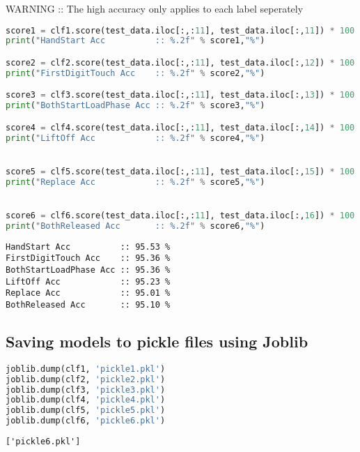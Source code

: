 WARNING :: The high accuracy only applies to each label seperately

\begin{lstlisting}[language=Python]
score1 = clf1.score(test_data.iloc[:,:11], test_data.iloc[:,11]) * 100
print("HandStart Acc          :: %.2f" % score1,"%")

score2 = clf2.score(test_data.iloc[:,:11], test_data.iloc[:,12]) * 100
print("FirstDigitTouch Acc    :: %.2f" % score2,"%")

score3 = clf3.score(test_data.iloc[:,:11], test_data.iloc[:,13]) * 100
print("BothStartLoadPhase Acc :: %.2f" % score3,"%")

score4 = clf4.score(test_data.iloc[:,:11], test_data.iloc[:,14]) * 100
print("LiftOff Acc            :: %.2f" % score4,"%")


score5 = clf5.score(test_data.iloc[:,:11], test_data.iloc[:,15]) * 100
print("Replace Acc            :: %.2f" % score5,"%")


score6 = clf6.score(test_data.iloc[:,:11], test_data.iloc[:,16]) * 100
print("BothReleased Acc       :: %.2f" % score6,"%")
\end{lstlisting}

\begin{lstlisting}
HandStart Acc          :: 95.53 %
FirstDigitTouch Acc    :: 95.36 %
BothStartLoadPhase Acc :: 95.36 %
LiftOff Acc            :: 95.23 %
Replace Acc            :: 95.01 %
BothReleased Acc       :: 95.10 %
\end{lstlisting}

\hypertarget{saving-models-to-pickle-files-using-joblib}{%
\subsection{Saving models to pickle files using
Joblib}\label{saving-models-to-pickle-files-using-joblib}}

\begin{lstlisting}[language=Python]
joblib.dump(clf1, 'pickle1.pkl')
joblib.dump(clf2, 'pickle2.pkl')
joblib.dump(clf3, 'pickle3.pkl')
joblib.dump(clf4, 'pickle4.pkl')
joblib.dump(clf5, 'pickle5.pkl')
joblib.dump(clf6, 'pickle6.pkl')
\end{lstlisting}

\begin{lstlisting}
['pickle6.pkl']
\end{lstlisting}
